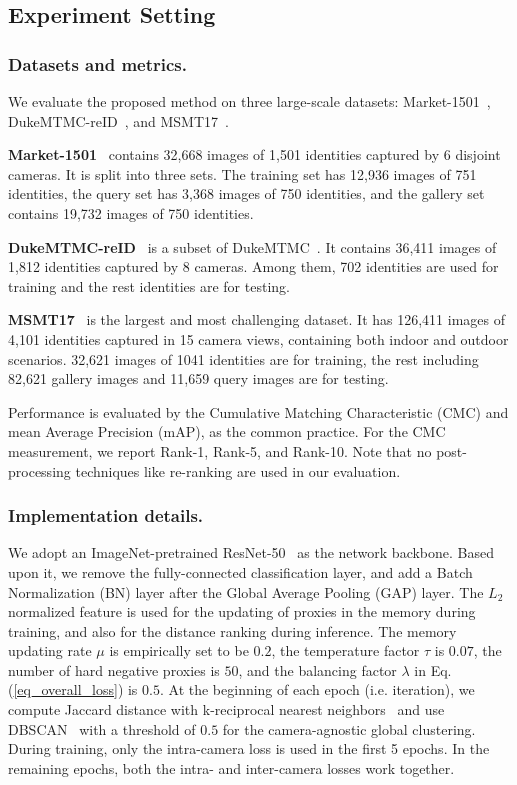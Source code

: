\documentclass[letterpaper]{article} %
\begin{document}
\subsection{Experiment Setting}
\subsubsection{Datasets and metrics.} 
We evaluate the proposed method on three large-scale datasets: Market-1501~\cite{7410490}, DukeMTMC-reID~\cite{zheng2017unlabeled}, and MSMT17~\cite{wei2018person}. 

\textbf{Market-1501}~\cite{7410490} contains 32,668 images of 1,501 identities captured by 6 disjoint cameras. It is split into three sets. The training set has 12,936 images of 751 identities, the query set has 3,368 images of 750 identities, and the gallery set contains 19,732 images of 750 identities. 

\textbf{DukeMTMC-reID}~\cite{zheng2017unlabeled} is a subset of DukeMTMC~\cite{ristani2016performance}. It contains 36,411 images of 1,812 identities captured by 8 cameras. Among them, 702 identities are used for training and the rest identities are for testing. 

\textbf{MSMT17}~\cite{wei2018person} is the largest and most challenging dataset. It has 126,411 images of 4,101 identities captured in 15 camera views, containing both indoor and outdoor scenarios. 32,621 images of 1041 identities are for training, the rest including 82,621 gallery images and 11,659 query images are for testing. 


Performance is evaluated by the Cumulative Matching Characteristic (CMC) and mean Average Precision (mAP), as the common practice. For the CMC measurement, we report Rank-1, Rank-5, and Rank-10. Note that no post-processing techniques like re-ranking \cite{Zhong2017reranking} are used in our evaluation.


\subsubsection{Implementation details.} 
We adopt an ImageNet-pretrained ResNet-50~\cite{he2016deep} as the network backbone. Based upon it, we remove the fully-connected classification layer, and add a Batch Normalization (BN) layer after the Global Average Pooling (GAP) layer. The $L_2$ normalized feature is used for the updating of proxies in the memory during training, and also for the distance ranking during inference. The memory updating rate $\mu$ is empirically set to be $0.2$, the temperature factor $\tau$ is $0.07$, the number of hard negative proxies is $50$, and the balancing factor $\lambda$ in Eq. (\ref{eq_overall_loss}) is $0.5$. At the beginning of each epoch (i.e. iteration), we compute Jaccard distance with k-reciprocal nearest neighbors~\cite{Zhong2017reranking} and use DBSCAN~\cite{ester1996density} with a threshold of $0.5$ for the camera-agnostic global clustering. During training, only the intra-camera loss is used in the first 5 epochs. In the remaining epochs, both the intra- and inter-camera losses work together. 
\end{document}
